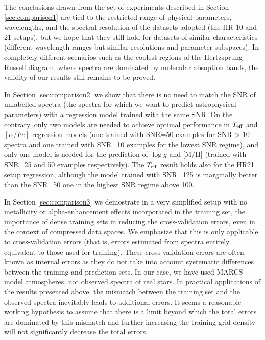 \documentclass[a4paper,fleqn,usenatbib]{mnras}
\begin{document}
{{{The conclusions drawn from the set of experiments described in Section \ref{sec:comparison1}
are tied to the restricted range of physical parameters, wavelengths,
and the spectral resolution of the datasets adopted (the HR 10 and 21 setups), but we hope that they
still hold for datasets of similar characteristics (different
wavelength ranges but similar resolutions and parameter subspaces). In
completely different scenarios such as the coolest regions of the
Hertzsprung-Russell diagram, where spectra are dominated by molecular
absoption bands, the validity of our results still remains to be proved.

In Section \ref{sec:comparison2} we show that there is no need to match 
the SNR of unlabelled spectra (the spectra for which we want to predict 
astrophysical parameters) with a regression model trained with the same SNR. 
On the contrary, only two models are needed to achieve optimal performance 
in $T_{\rm eff}$ and $\left[ \alpha/Fe \right]$ regression models (one trained 
with SNR=50 examples for SNR > 10 spectra and one trained with SNR=10 examples 
for the lowest SNR regime), and only one model is needed for the prediction 
of $\log g$ and [M/H] (trained with SNR=25 and 50 examples respectively). 
The $T_{\rm eff}$ result holds also for the HR21 setup regression, although the  
model trained with SNR=125 is marginally better than the SNR=50 one in the highest 
SNR regime above 100.

In Section \ref{sec:comparison3} we demostrate in a very simplified setup with 
no metallicity or alpha-enhancement effects incorporated in the training set,
the importance of dense training sets in reducing the cross-validation errors, 
even in the context of compressed data spaces. We emphasize that this is only 
applicable to cross-validation errors (that is, errors estimated from spectra 
entirely equivalent to those used for training). These cross-validation errors 
are often known as internal errors as they do not take into account systematic 
differences between the training and prediction sets. In our case, we have used 
MARCS model atmospheres, not observed spectra of real stars. In practical 
applications of the results presented above, the mismatch between the training 
set and the observed spectra inevitably leads to additional errors.
It seems a reasonable working hypothesis to assume that there is a limit beyond 
which the total errors are dominated by this mismatch and further increasing the 
training grid density will not significantly decrease the total errors.  

}}}
\end{document}
